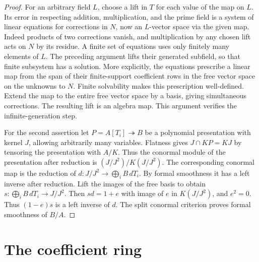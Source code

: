\begin{proof}
For an arbitrary field \(L\), choose a lift in \(T\) for each value
of the map on \(L\). Its error in respecting addition, multiplication,
and the prime field is a system of linear equations for corrections in
\(N\), now an \(L\)-vector space via the given map. Indeed products of
two corrections vanish, and multiplication by any chosen lift acts
on \(N\) by its residue. A finite set of equations uses only finitely
many elements of \(L\). The preceding argument lifts their generated
subfield, so that finite subsystem has a solution. More explicitly,
the equations prescribe a linear map from the span of their
finite-support coefficient rows in the free vector space on the
unknowns to \(N\). Finite solvability makes this prescription
well-defined. Extend the map to the entire free vector space by a
basis, giving simultaneous corrections. The resulting lift is an
algebra map. This argument verifies the infinite-generation step.

For the second assertion let \(P=A[T_i]\twoheadrightarrow B\) be
a polynomial presentation with kernel \(J\), allowing arbitrarily many
variables. Flatness gives \(J\cap KP=KJ\) by tensoring the presentation
with \(A/K\). Thus the conormal module of the presentation after
reduction is \((J/J^2)/K(J/J^2)\). The corresponding conormal map
is the reduction of \(d:J/J^2\to\bigoplus_i B\,dT_i\). By formal
smoothness it has a left inverse after reduction. Lift the images
of the free basis to obtain \(s:\bigoplus_i B\,dT_i\to J/J^2\).
Then \(sd=1+e\) with image of \(e\) in \(K(J/J^2)\), and \(e^2=0\).
Thus \((1-e)s\) is a left inverse of \(d\). The split conormal
criterion proves formal smoothness of \(B/A\).
\end{proof}

\section{The coefficient ring}


